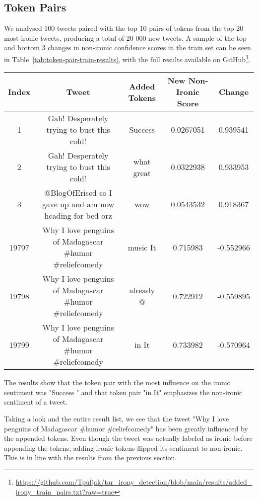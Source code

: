 \documentclass[10pt, a4paper]{article}
\begin{document}
\subsection{Token Pairs}

We analysed 100 tweets paired with the top 10 pairs of tokens from the top 20 most ironic tweets, producing a total of 20 000 new tweets.
A sample of the top and bottom 3 changes in non-ironic confidence scores in the train set can be seen in Table~\ref{tab:token-pair-train-results}, with the full results available on GitHub\footnote{\url{https://github.com/Tpuljak/tar_irony_detection/blob/main/results/added_irony_train_pairs.txt?raw=true}}.

\begin{table*}
\caption{Sample of Token Pair Results on the Train Set}
\label{tab:token-pair-train-results}
\begin{center}
\begin{tabular}{c|c|c|c|c}
\toprule
Index & Tweet & Added Tokens & New Non-Ironic Score & Change\\
\midrule
1     & Gah! Desperately trying to bust this cold!                & Success \textvisiblespace & 0.0267051 & 0.939541  \\
2     & Gah! Desperately trying to bust this cold!                & what great                & 0.0322938 & 0.933953  \\
3     & @BlogOfErised so I gave up and am now heading for bed orz & wow \textvisiblespace     & 0.0543532 & 0.918367  \\
19797 & Why I love penguins of Madagascar \#humor \#reliefcomedy  & music It                  & 0.715983  & -0.552966 \\
19798 & Why I love penguins of Madagascar \#humor \#reliefcomedy  & already @                 & 0.722912  & -0.559895 \\
19799 & Why I love penguins of Madagascar \#humor \#reliefcomedy  & in It                     & 0.733982  & -0.570964 \\
\bottomrule
\end{tabular}
\end{center}
\end{table*}

The results show that the token pair with the most influence on the ironic sentiment was "Success \textvisiblespace " and that token pair "in It" emphasizes the non-ironic sentiment of a tweet.

Taking a look and the entire result list, we see that the tweet "Why I love penguins of Madagascar  \#humor \#reliefcomedy" has been greatly influenced by the appended tokens.
Even though the tweet was actually labeled as ironic before appending the tokens, adding ironic tokens flipped its sentiment to non-ironic.
This is in line with the results from the previous section.
\end{document}
